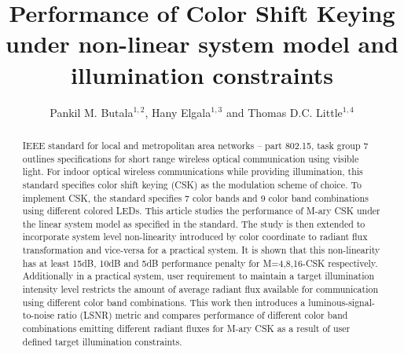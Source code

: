 \documentclass[10pt,letterpaper]{article}
\begin{document}
\title{Performance of Color Shift Keying under non-linear system model and illumination constraints}

\author{Pankil M. Butala$^{1,2}$, Hany Elgala$^{1,3}$ and Thomas D.C. Little$^{1,4}$}

\address{$^{1}$Multimedia Communication Laboratory and Smart Lighting Engineering Research Center\\
Boston University, Boston, MA 02215, USA\\
\{$^2$pbutala,$^3$helgala,$^4$tdcl\}@bu.edu}



\begin{abstract}
IEEE standard for local and metropolitan area networks -- part 802.15, task group 7 outlines specifications for short range wireless optical communication using visible light. For indoor optical wireless communications while providing illumination, this standard specifies color shift keying (CSK) as the modulation scheme of choice. To implement CSK, the standard specifies 7 color bands and 9 color band combinations using different colored LEDs. This article studies the performance of M-ary CSK under the linear system model as specified in the standard. The study is then extended to incorporate system level non-linearity introduced by color coordinate to radiant flux transformation and vice-versa for a practical system. It is shown that this non-linearity has at least 15dB, 10dB and 5dB performance penalty for M=4,8,16-CSK respectively. Additionally in a practical system, user requirement to maintain a target illumination intensity level restricts the amount of average radiant flux available for communication using different color band combinations. This work then introduces a luminous-signal-to-noise ratio (LSNR) metric and compares performance of different color band combinations emitting different radiant fluxes for M-ary CSK as a result of user defined target illumination constraints.
\end{abstract}

\end{document}
